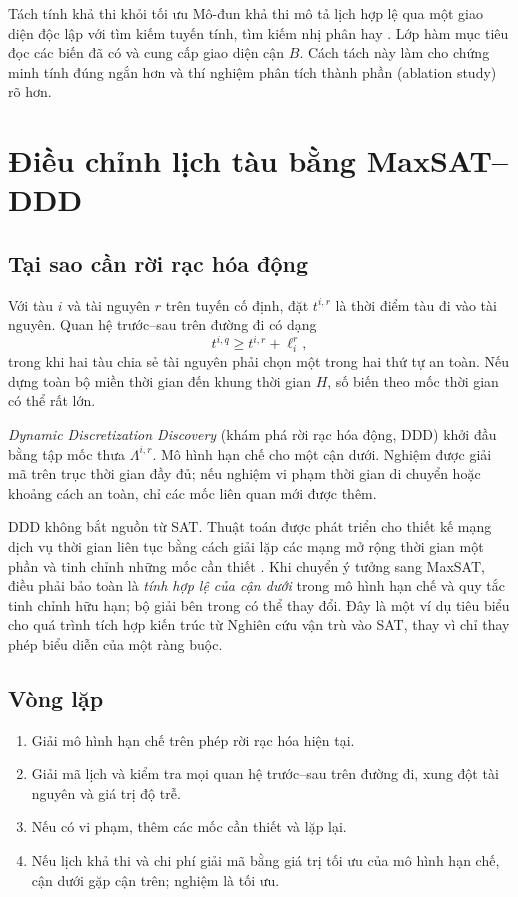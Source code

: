\begin{keyidea}{Tách tính khả thi khỏi tối ưu}
Mô-đun khả thi mô tả lịch hợp lệ qua một giao diện độc lập với tìm kiếm tuyến
tính, tìm kiếm nhị phân hay \MaxSAT. Lớp hàm mục tiêu đọc các biến đã có và
cung cấp giao diện cận \(B\). Cách tách này làm cho chứng minh tính đúng ngắn
hơn và thí nghiệm phân tích thành phần (ablation study) rõ hơn.
\end{keyidea}

\section{Điều chỉnh lịch tàu bằng MaxSAT--DDD}

\subsection{Tại sao cần rời rạc hóa động}

Với tàu \(i\) và tài nguyên \(r\) trên tuyến cố định, đặt \(t^{i,r}\) là thời
điểm tàu đi vào tài nguyên. Quan hệ trước--sau trên đường đi có dạng
\[
  t^{i,q}\ge t^{i,r}+\ell_i^r,
\]
trong khi hai tàu chia sẻ tài nguyên phải chọn một trong hai thứ tự an toàn.
Nếu dựng toàn bộ miền thời gian đến khung thời gian \(H\), số biến theo mốc thời gian có thể
rất lớn.

\emph{Dynamic Discretization Discovery} (khám phá rời rạc hóa động, DDD) khởi
đầu bằng tập mốc thưa \(\Lambda^{i,r}\). Mô hình hạn chế cho một cận dưới.
Nghiệm được giải mã trên trục thời gian đầy đủ; nếu nghiệm vi phạm thời gian di
chuyển hoặc khoảng cách an toàn, chỉ các mốc liên quan mới được thêm.

DDD không bắt nguồn từ SAT. Thuật toán được phát triển cho thiết kế mạng dịch
vụ thời gian liên tục bằng cách giải lặp các mạng mở rộng thời gian một phần
và tinh chỉnh những mốc cần thiết \parencite{boland2017ddd}. Khi chuyển ý tưởng
sang MaxSAT, điều phải bảo toàn là \emph{tính hợp lệ của cận dưới} trong mô
hình hạn chế và quy tắc tinh chỉnh hữu hạn; bộ giải bên trong có thể thay đổi.
Đây là một ví dụ tiêu biểu cho quá trình tích hợp kiến trúc từ Nghiên cứu vận trù
vào SAT, thay vì chỉ thay phép biểu diễn của một ràng buộc.

\subsection{Vòng lặp}

\begin{enumerate}
  \item Giải mô hình \MaxSAT hạn chế trên phép rời rạc hóa hiện tại.
  \item Giải mã lịch và kiểm tra mọi quan hệ trước--sau trên đường đi, xung
        đột tài nguyên và giá trị độ trễ.
  \item Nếu có vi phạm, thêm các mốc cần thiết và lặp lại.
  \item Nếu lịch khả thi và chi phí giải mã bằng giá trị tối ưu của mô hình
        hạn chế, cận dưới gặp cận trên; nghiệm là tối ưu.
\end{enumerate}

